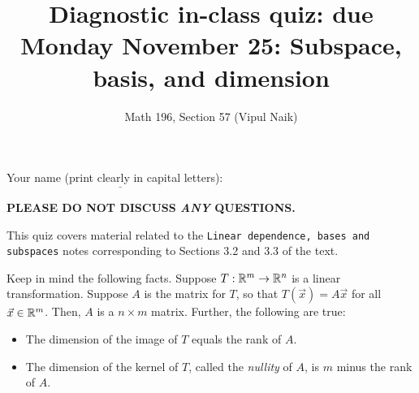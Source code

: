 \documentclass[10pt]{amsart}
\title{Diagnostic in-class quiz: due Monday November 25: Subspace, basis, and dimension}
\author{Math 196, Section 57 (Vipul Naik)}
\begin{document}
\maketitle

Your name (print clearly in capital letters): $\underline{\qquad\qquad\qquad\qquad\qquad\qquad\qquad\qquad\qquad\qquad}$

{\bf PLEASE DO NOT DISCUSS {\em ANY} QUESTIONS.}

This quiz covers material related to the {\tt Linear dependence, bases
  and subspaces} notes corresponding to Sections 3.2 and 3.3 of the
text.

Keep in mind the following facts. Suppose $T:\mathbb{R}^m \to \mathbb{R}^n$ is a
linear transformation. Suppose $A$ is the matrix for $T$, so that
$T(\vec{x}) = A\vec{x}$ for all $\vec{x} \in \mathbb{R}^m$. Then, $A$ is a $n
\times m$ matrix. Further, the following are true:

\begin{itemize}
\item The dimension of the image of $T$ equals the rank of $A$.
\item The dimension of the kernel of $T$, called the {\em nullity} of
  $A$, is $m$ minus the rank of $A$.
\end{itemize}
\end{document}
